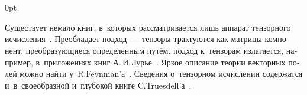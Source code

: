 \section*{\small \wordforbibliography}

\begin{changemargin}{\parindent}{0pt}
\fontsize{10}{12}\selectfont

\begin{otherlanguage}{russian}

Существует немало книг, в~которых рассматривается лишь аппарат тензорного исчисления~\cite{borisenkotarapov, mcconnell-tensoranalysis, rashevsky-riemanniangeometry, sokolnikov, schouten-tensoranalysis}. Преобладает  подход~--- тензоры трактуются как матрицы компонент, преобразующиеся определённым путём.
 подход к~тензорам излагается, например, в~приложениях книг А.\,И.\;Лурье~\cite{lurie-nonlinearelasticity, lurie-theoryofelasticity}.
Яркое описание теории векторных полей можно найти у~R.\:Feynman’а~\cite{feynman-lecturesonphysics}.
Сведения о~тензорном исчислении содержатся и~в~своеобразной и~глубокой книге C.\:Truesdell’а~\cite{truesdell-firstcourse}.

\end{otherlanguage}

\end{changemargin}
